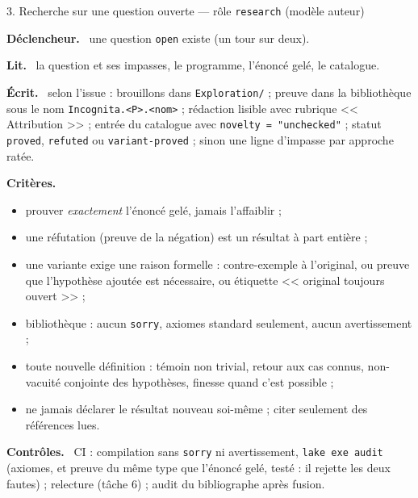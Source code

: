 \documentclass[11pt,a4paper]{article}
\newcommand{\cmd}[1]{\texttt{#1}}
\newcommand{\rub}[1]{\par\smallskip\textsf{\textbf{#1.}}~}
\begin{document}
\begin{tache}{3. Recherche sur une question ouverte --- rôle \cmd{research} (modèle auteur)}
\rub{Déclencheur} une question \cmd{open} existe (un tour sur deux).
\rub{Lit} la question et ses impasses, le programme, l'énoncé gelé, le catalogue.
\rub{Écrit} selon l'issue : brouillons dans \cmd{Exploration/} ; preuve dans la bibliothèque sous le nom
\cmd{Incognita.<P>.<nom>} ; rédaction lisible avec rubrique << Attribution >> ; entrée du catalogue
avec \cmd{novelty = "unchecked"} ; statut \cmd{proved}, \cmd{refuted} ou \cmd{variant-proved} ; sinon une
ligne d'impasse par approche ratée.
\rub{Critères}
\begin{itemize}
\item prouver \emph{exactement} l'énoncé gelé, jamais l'affaiblir ;
\item une réfutation (preuve de la négation) est un résultat à part entière ;
\item une variante exige une raison formelle : contre-exemple à l'original, ou preuve que l'hypothèse
  ajoutée est nécessaire, ou étiquette << original toujours ouvert >> ;
\item bibliothèque : aucun \cmd{sorry}, axiomes standard seulement, aucun avertissement ;
\item toute nouvelle définition : témoin non trivial, retour aux cas connus, non-vacuité conjointe
  des hypothèses, finesse quand c'est possible ;
\item ne jamais déclarer le résultat nouveau soi-même ; citer seulement des références lues.
\end{itemize}
\rub{Contrôles} CI : compilation sans \cmd{sorry} ni avertissement, \cmd{lake exe audit} (axiomes, et
preuve du même type que l'énoncé gelé, testé : il rejette les deux fautes) ; relecture (tâche 6) ;
audit du bibliographe après fusion.
\end{tache}
\end{document}
